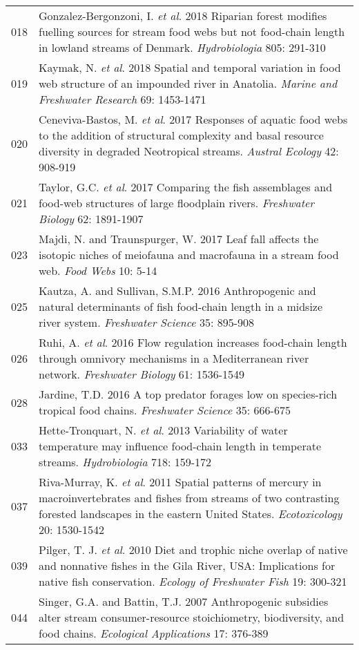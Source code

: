 \begin{longtable}{p{}p{}}
  018 & Gonzalez-Bergonzoni, I. \textit{et al}. 2018 Riparian forest modifies fuelling sources for stream food webs but not food-chain length in lowland streams of Denmark. \textit{Hydrobiologia} 805: 291-310 \\ 
  019 & Kaymak, N. \textit{et al}. 2018 Spatial and temporal variation in food web structure of an impounded river in Anatolia. \textit{Marine and Freshwater Research} 69: 1453-1471 \\ 
  020 & Ceneviva-Bastos, M. \textit{et al}. 2017 Responses of aquatic food webs to the addition of structural complexity and basal resource diversity in degraded Neotropical streams. \textit{Austral Ecology} 42: 908-919 \\ 
  021 & Taylor, G.C. \textit{et al}. 2017 Comparing the fish assemblages and food-web structures of large floodplain rivers. \textit{Freshwater Biology} 62: 1891-1907 \\ 
  023 & Majdi, N. and Traunspurger, W. 2017 Leaf fall affects the isotopic niches of meiofauna and macrofauna in a stream food web. \textit{Food Webs} 10: 5-14 \\ 
  025 & Kautza, A. and Sullivan, S.M.P. 2016 Anthropogenic and natural determinants of fish food-chain length in a midsize river system. \textit{Freshwater Science} 35: 895-908 \\ 
  026 & Ruhi, A. \textit{et al}. 2016 Flow regulation increases food-chain length through omnivory mechanisms in a Mediterranean river network. \textit{Freshwater Biology} 61: 1536-1549 \\ 
  028 & Jardine, T.D. 2016 A top predator forages low on species-rich tropical food chains. \textit{Freshwater Science} 35: 666-675 \\ 
  033 & Hette-Tronquart, N. \textit{et al}. 2013 Variability of water temperature may influence food-chain length in temperate streams. \textit{Hydrobiologia} 718: 159-172 \\ 
  037 & Riva-Murray, K. \textit{et al}. 2011 Spatial patterns of mercury in macroinvertebrates and fishes from streams of two contrasting forested landscapes in the eastern United States. \textit{Ecotoxicology} 20: 1530-1542 \\ 
  039 & Pilger, T. J. \textit{et al}. 2010 Diet and trophic niche overlap of native and nonnative fishes in the Gila River, USA: Implications for native fish conservation. \textit{Ecology of Freshwater Fish} 19: 300-321 \\ 
  044 & Singer, G.A. and Battin, T.J. 2007 Anthropogenic subsidies alter stream consumer-resource stoichiometry, biodiversity, and food chains. \textit{Ecological Applications} 17: 376-389 \\ 

\end{longtable}
